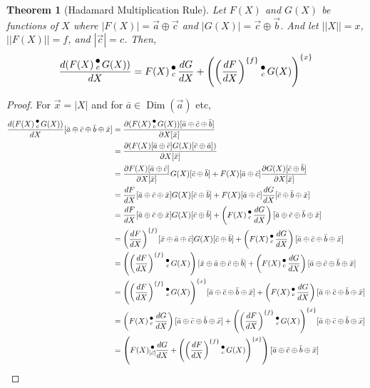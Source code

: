 \documentclass[12pt]{book}
\theoremstyle{plain}
\newtheorem{theorem}{Theorem}[chapter]
\theoremstyle{definition}
\theoremstyle{ppart}
\theoremstyle{case}
\theoremstyle{solution}
\DeclareMathOperator{\Dim}{Dim}
\newcommand{\dmult}[1]{\text{\raisebox{1ex}{$\underset{#1}{\,\bullet\,}$}}}
\newcommand{\shape}[1]{\left|#1\right|}
\newcommand{\transpose}[2]{{#1}^{\{#2\}}}
\begin{document}
\begin{theorem}[Hadamard Multiplication Rule]
\label{hadamard_rule}
Let $F(X)$ and $G(X)$ be functions of $X$ where
$\shape{F(X)} = \vec{a} \oplus \vec{c}$ and $\shape{G(X)} = \vec{c} \oplus \vec{b}$.
And let $\shape{\shape{X}} = x$, $\shape{\shape{F(X)}} = f$, and $\shape{\vec{c}} = c$.
Then,
\[
  \frac{d(F(X) \dmult{c} G(X))}{dX} =
    F(X) \dmult{c} \frac{dG}{dX} +
    \transpose{\left(\transpose{\left(\frac{dF}{dX}\right)}{f} \dmult{c} G(X)\right)}{x}
\]
\end{theorem}
\begin{landscape}
\begin{proof}
For $\vec{x} = \shape{X}$ and for $\bar{a} \in \Dim(\vec{a})$ etc,
\begin{align*}
\frac{d(F(X) \dmult{c} G(X))}{dX}[\bar{a} \oplus \bar{c} \oplus \bar{b} \oplus \bar{x}]
  &= \frac{\partial (F(X) \dmult{c} G(X))[\bar{a} \oplus \bar{c} \oplus \bar{b}]}{\partial X[\bar{x}]} \\
  &= \frac{\partial (F(X)[\bar{a} \oplus \bar{c}] G(X)[\bar{c} \oplus \bar{a}])}{\partial X[\bar{x}]} \\
  &= \frac{\partial F(X)[\bar{a} \oplus \bar{c}]}{\partial X[\bar{x}]} G(X)[\bar{c} \oplus \bar{b}]
    + F(X)[\bar{a} \oplus \bar{c}] \frac{\partial G(X)[\bar{c} \oplus \bar{b}]}{\partial X[\bar{x}]} \\
  &= \frac{dF}{dX}[\bar{a} \oplus \bar{c} \oplus \bar{x}] G(X)[\bar{c} \oplus \bar{b}]
    + F(X)[\bar{a} \oplus \bar{c}] \frac{dG}{dX}[\bar{c} \oplus \bar{b} \oplus \bar{x}] \\
  &= \frac{dF}{dX}[\bar{a} \oplus \bar{c} \oplus \bar{x}] G(X)[\bar{c} \oplus \bar{b}]
    + \left(F(X) \dmult{c} \frac{dG}{dX}\right)[\bar{a} \oplus \bar{c} \oplus \bar{b} \oplus \bar{x}] \\
  &= \transpose{\left(\frac{dF}{dX}\right)}{f}[\bar{x} \oplus \bar{a} \oplus \bar{c}] G(X)[\bar{c} \oplus \bar{b}]
    + \left(F(X) \dmult{c} \frac{dG}{dX}\right)[\bar{a} \oplus \bar{c} \oplus \bar{b} \oplus \bar{x}] \\
  &= \left(\transpose{\left(\frac{dF}{dX}\right)}{f} \dmult{c} G(X)\right) [\bar{x} \oplus \bar{a} \oplus \bar{c} \oplus \bar{b}]
    + \left(F(X) \dmult{c} \frac{dG}{dX}\right)[\bar{a} \oplus \bar{c} \oplus \bar{b} \oplus \bar{x}] \\
  &= \transpose{\left(\transpose{\left(\frac{dF}{dX}\right)}{f} \dmult{c} G(X)\right)}{x}[\bar{a} \oplus \bar{c} \oplus \bar{b} \oplus \bar{x}]
    + \left(F(X) \dmult{c} \frac{dG}{dX}\right)[\bar{a} \oplus \bar{c} \oplus \bar{b} \oplus \bar{x}] \\
  &= \left(F(X) \dmult{c} \frac{dG}{dX}\right)[\bar{a} \oplus \bar{c} \oplus \bar{b} \oplus \bar{x}]
    + \transpose{\left(\transpose{\left(\frac{dF}{dX}\right)}{f} \dmult{c} G(X)\right)}{x} [\bar{a} \oplus \bar{c} \oplus \bar{b} \oplus \bar{x}] \\
  &= \left( F(X) \dmult{\shape{\vec{c}}} \frac{dG}{dX}
    + \transpose{\left(\transpose{\left(\frac{dF}{dX}\right)}{f} \dmult{c} G(X)\right)}{x} \right)[\bar{a} \oplus \bar{c} \oplus \bar{b} \oplus \bar{x}]
\end{align*}
\end{proof}
\end{landscape}
\end{document}
